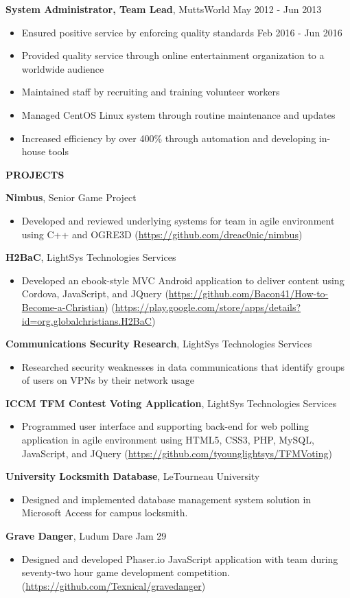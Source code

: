 \documentclass[letterpaper]{article}
\newcommand{\altsection}[1]{\noindent\textbf{#1}\smallskip}
\newcommand{\entry}[3]{\textbf{#1}, #2\begin{itemize}[leftmargin=3.5em]#3\end{itemize}\bigskip}
\begin{document}
\entry{System Administrator, Team Lead}{MuttsWorld                             \hfill          May 2012 - Jun 2013}  {
    \item Ensured positive service by enforcing quality standards       \hfill          Feb 2016 - Jun 2016
    \item Provided quality service through online entertainment organization to a worldwide audience
    \item Maintained staff by recruiting and training volunteer workers
    \item Managed CentOS Linux system through routine maintenance and updates
    \item Increased efficiency by over 400\% through automation and developing in-house tools
}

\altsection{PROJECTS}

\entry{Nimbus}{Senior Game Project} {
    \item Developed and reviewed underlying systems for team in agile environment using C++ and OGRE3D (\url{https://github.com/dreac0nic/nimbus})
}

\entry{H2BaC}{LightSys Technologies Services} {
    \item Developed an ebook-style MVC Android application to deliver content using Cordova, JavaScript, and JQuery (\url{https://github.com/Bacon41/How-to-Become-a-Christian}) (\url{https://play.google.com/store/apps/details?id=org.globalchristians.H2BaC})
}

\entry{Communications Security Research}{LightSys Technologies Services}{
    \item Researched security weaknesses in data communications that identify groups of users on VPNs by their network usage
}

\entry{ICCM TFM Contest Voting Application}{LightSys Technologies Services} {
    \item Programmed user interface and supporting back-end for web polling application in agile environment using HTML5, CSS3, PHP, MySQL, JavaScript, and JQuery (\url{https://github.com/tyounglightsys/TFMVoting})
}

\entry{University Locksmith Database}{LeTourneau University} {
    \item Designed and implemented database management system solution in Microsoft Access for campus locksmith.
}

\entry{Grave Danger}{Ludum Dare Jam 29} {
    \item Designed and developed Phaser.io JavaScript application with team during seventy-two hour game development competition. (\url{https://github.com/Texnical/gravedanger})
}
\end{document}
